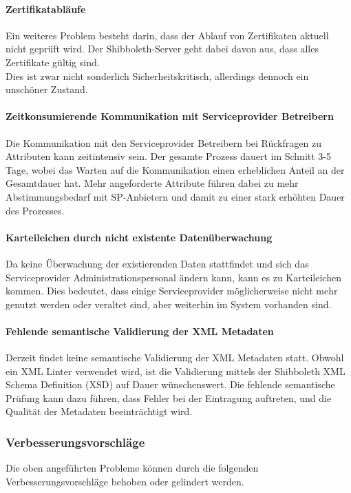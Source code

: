 \documentclass[a4paper, fontsize=11pt]{scrartcl}
\begin{document}
\paragraph{Zertifikatabläufe}
Ein weiteres Problem besteht darin, dass der Ablauf von Zertifikaten aktuell nicht geprüft wird. Der Shibboleth-Server geht dabei davon aus, dass alles Zertifikate gültig sind.\\
Dies ist zwar nicht sonderlich Sicherheitskritisch, allerdings dennoch ein unschöner Zustand.

\paragraph{Zeitkonsumierende Kommunikation mit Serviceprovider Betreibern}
Die Kommunikation mit den Serviceprovider Betreibern bei Rückfragen zu Attributen kann zeitintensiv sein.
Der gesamte Prozess dauert im Schnitt 3-5 Tage, wobei das Warten auf die Kommunikation einen erheblichen Anteil an der Gesamtdauer hat.
Mehr angeforderte Attribute führen dabei zu mehr Abstimmungsbedarf mit SP-Anbietern und damit zu einer stark erhöhten Dauer des Prozesses.

\paragraph{Karteileichen durch nicht existente Datenüberwachung}
Da keine Überwachung der existierenden Daten stattfindet und sich das Serviceprovider Administrationspersonal ändern kann, kann es zu Karteileichen kommen.
Dies bedeutet, dass einige Serviceprovider möglicherweise nicht mehr genutzt werden oder veraltet sind, aber weiterhin im System vorhanden sind.

\paragraph{Fehlende semantische Validierung der XML Metadaten}

Derzeit findet keine semantische Validierung der XML Metadaten statt.
Obwohl ein XML Linter verwendet wird, ist die Validierung mittels der Shibboleth XML Schema Definition (XSD) auf Dauer wünschenswert.
Die fehlende semantische Prüfung kann dazu führen, dass Fehler bei der Eintragung auftreten, und die Qualität der Metadaten beeinträchtigt wird.

\subsubsection{Verbesserungsvorschläge}
Die oben angeführten Probleme können durch die folgenden Verbesserungsvorschläge behoben oder gelindert werden.
\end{document}
